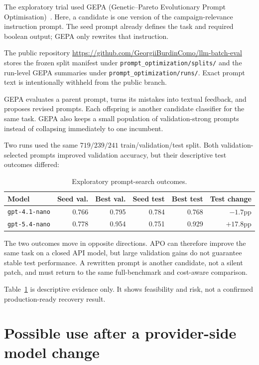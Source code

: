 The exploratory trial used GEPA (Genetic--Pareto Evolutionary Prompt
Optimisation)~\cite{agrawal2025gepa}. Here, a candidate is one version of the
campaign-relevance instruction prompt. The seed prompt already defines the task
and required boolean output; GEPA only rewrites that instruction.

The public repository
\url{https://github.com/GeorgiiBurdinComo/llm-batch-eval}
stores the frozen split manifest under \texttt{prompt\_optimization/splits/}
and the run-level GEPA summaries under \texttt{prompt\_optimization/runs/}.
Exact prompt text is intentionally withheld from the public branch.

GEPA evaluates a parent prompt, turns its mistakes into textual feedback, and
proposes revised prompts. Each offspring is another candidate classifier for the
same task. GEPA also keeps a small population of validation-strong prompts
instead of collapsing immediately to one incumbent.

Two runs used the same \(719/239/241\) train/validation/test split. Both validation-selected prompts improved validation accuracy, but their descriptive test outcomes differed:

\begin{table}[htbp]
\centering
\small
\caption{Exploratory prompt-search outcomes.}
\label{tab:app-gepa-runs}
\begin{tabular}{lrrrrr}
\toprule
Model & Seed val. & Best val. & Seed test & Best test & Test change \\
\midrule
\texttt{gpt-4.1-nano} & 0.766 & 0.795 & 0.784 & 0.768 & \(-1.7\)pp \\
\texttt{gpt-5.4-nano} & 0.778 & 0.954 & 0.751 & 0.929 & \(+17.8\)pp \\
\bottomrule
\end{tabular}
\end{table}

The two outcomes move in opposite directions. APO can therefore improve the same
task on a closed API model, but large validation gains do not guarantee stable
test performance. A rewritten prompt is another candidate, not a silent patch,
and must return to the same full-benchmark and cost-aware comparison.

Table~\ref{tab:app-gepa-runs} is descriptive evidence only. It shows feasibility
and risk, not a confirmed production-ready recovery result.

\section{Possible use after a provider-side model change}

